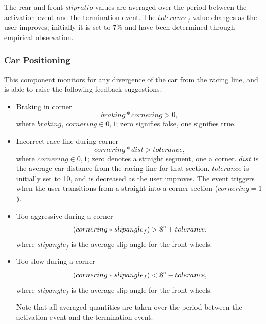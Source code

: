 The rear and front $slipratio$ values are averaged over the period between the activation event and the termination event. The $tolerance_f$ value changes as the user improves; initially it is set to $7\%$ and have been determined through empirical observation.

\subsubsection{Car Positioning}
This component monitors for any divergence of the car from the racing line, and is able to raise the following feedback suggestions:
\begin{itemize}
	\item Braking in corner
	\begin{equation}
		braking * cornering > 0,
	\end{equation}
	where $braking$, $cornering \in {0,1}$; zero signifies false, one signifies true. 
	\item Incorrect race line during corner
	\begin{equation}
		cornering * dist > tolerance,
	\end{equation}
	where $cornering \in {0,1}$; zero denotes a straight segment, one a corner. $dist$ is the average car distance from the racing line for that section. $tolerance$ is initially set to 10, and is decreased as the user improves. The event triggers when the user transitions from a straight into a corner section ($cornering = 1$).
	\item Too aggressive during a corner
	\begin{equation}
		(cornering * slipangle_f) > 8\degree + tolerance,
	\end{equation}
	where $slipangle_f$ is the average slip angle for the front wheels.
	\item Too slow during a corner
	\begin{equation}
		(cornering * slipangle_f) < 8\degree - tolerance,
	\end{equation}
	where $slipangle_f$ is the average slip angle for the front wheels.
	
	Note that all averaged quantities are taken over the period between the activation event and the termination event.	
\end{itemize}

